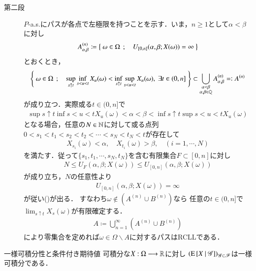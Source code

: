 \begin{prf}
\begin{description}
			\item[第二段]
				$P$-a.s.にパスが各点で左極限を持つことを示す．いま，$n \geq 1$として$\alpha < \beta$に対し
				\begin{align}
					A^{(n)}_{\alpha,\beta}
					\coloneqq \left\{\ \omega \in \Omega\ \, ; \quad U_{[0,n]}(\alpha,\beta;X(\omega)) = \infty\ \right\}
				\end{align}
				とおくとき，
				\begin{align}
					\left\{\ \omega \in \Omega\ \, ; \quad \operatorname*{sup}_{s \uparrow t} \operatorname*{inf}_{s < u < t} X_u(\omega)
					< \operatorname*{inf}_{s \uparrow t} \operatorname*{sup}_{s < u < t} X_u(\omega),\ \exists t \in (0,n]\ \right\}
					\subset \bigcup_{\substack{\alpha < \beta \\ \alpha,\beta \in \mathbb{Q}}}A^{(n)}_{\alpha,\beta}
					=\mathrel{\mathop:} A^{(n)}
					\label{eq:chapter_1_Theorem_3_8_v_1}
				\end{align}
				が成り立つ．実際或る$t \in (0,n]$で
				\begin{align}
					\sup{s \uparrow t}{}\inf{s < u < t}{X_u(\omega)}
					< \alpha < \beta < \inf{s \uparrow t}{}\sup{s < u < t}{X_u(\omega)}
				\end{align}
				となる場合，任意の$N \in \mathbb{N}$に対して或る点列
				$0 < s_1 < t_1 < s_2 < t_2 < \cdots < s_N < t_N < t$が存在して
				\begin{align}
					X_{s_i}(\omega) < \alpha,
					\quad X_{t_i}(\omega) > \beta,
					\quad (i=1,\cdots,N)
				\end{align}
				を満たす．従って$\{s_1,t_1,\cdots,s_N,t_N\}$を含む有限集合$F \subset [0,n]$に対し
				\begin{align}
					N \leq U_F(\alpha,\beta;X(\omega)) \leq U_{[0,n]}(\alpha,\beta;X(\omega))
				\end{align}
				が成り立ち，$N$の任意性より
				\begin{align}
					U_{[0,n]}(\alpha,\beta;X(\omega)) = \infty
				\end{align}
				が従い()が出る．
				すなわち$\omega \notin \left( A^{(n)} \cup B^{(n)} \right)$なら
				任意の$t \in (0,n]$で$\lim_{s \uparrow t} X_s(\omega)$が有限確定する．
				\begin{align}
					A \coloneqq \bigcup_{n=1}^\infty \left( A^{(n)} \cup B^{(n)} \right)
				\end{align}
				により零集合を定めれば$\omega \in \Omega \backslash A$に対するパスはRCLLである．
				\QED
		\end{description}
	\end{prf}
	
	\begin{itembox}[l]{一様可積分性と条件付き期待値}
		可積分な$X:\Omega \longrightarrow \mathbb{R}$に対し
		$\left( \operatorname{E} \left[ X \ \middle|\ \mathscr{G} \right] \right)_{\mathscr{G} \subset \mathscr{F}}$は一様可積分である．
	\end{itembox}
	

